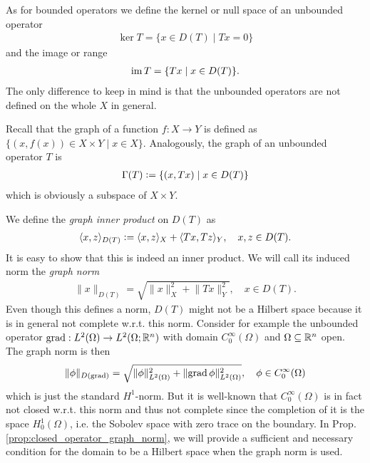 \documentclass[../master_thesis.tex]{subfiles}
\begin{document}
As for bounded operators we define the kernel or null space of an unbounded
operator 
\begin{align*}
    \ker T = \{ x \in D(T) \mid Tx = 0\}
\end{align*}
and the image or range
\begin{align*}
    \operatorname{im} T = \{ Tx \mid x \in D(T)\}.
\end{align*}
The only difference to keep in mind is that the unbounded operators are not 
defined on the whole $X$ in general.

Recall that the graph of a function $f: X \rightarrow Y$ is defined 
as $\{ (x,f(x)) \in X \times Y \mid x \in X\}$. 
Analogously, the graph of an unbounded operator $T$ is 
\begin{align*}
    \Gamma(T) \vcentcolon= \{ (x,Tx) \mid x \in D(T) \}
\end{align*}
which is obviously a subspace of $X\times Y$.

We define the \textit{graph inner product} on $D(T)$ as 
\begin{align*}
    \langle x,z \rangle _{D(T)} 
    \vcentcolon= \langle x,z \rangle _X + \langle Tx, Tz \rangle _Y,
    \quad x,z \in D(T).
\end{align*}
It is easy to show that this is indeed an inner product. We will call its 
induced norm the \textit{graph norm}
\begin{align*}
    \lVert x \rVert _{D(T)} = \sqrt{ \lVert x \rVert^2 _X + \lVert Tx \rVert ^2 _Y}
    , \quad x\in D(T).
\end{align*}
Even though this defines a norm, $D(T)$ might not be a Hilbert space 
because it is in general not complete w.r.t. this norm. Consider for example 
the unbounded operator $\operatorname{grad}: L^2(\Omega) \rightarrow L^2(\Omega;\mathbb{R}^n)$ with 
domain $C_0^\infty(\Omega)$ and $\Omega \subseteq \mathbb{R}^n$ open.
The graph norm is then 
\begin{align*}
    \lVert \phi \rVert _{D(\operatorname{grad})} 
    = \sqrt{ \lVert \phi \rVert^2 _{L^2(\Omega)} + \lVert \operatorname{grad} \phi \rVert^2 
        _{L^2(\Omega)}}
        , \quad \phi \in C_0^\infty(\Omega)
\end{align*}
which is just the standard $H^1$-norm.
But it is well-known that $C_0^\infty(\Omega)$ is in fact not closed 
w.r.t. this norm and thus not complete 
since the completion of it is the space $H^1_0(\Omega)$, i.e. 
the Sobolev space with zero trace on the boundary. 
In Prop.\,\ref{prop:closed_operator_graph_norm}, we will provide a
sufficient and necessary condition for the domain to be a Hilbert space 
when the graph norm is used. 
\end{document}
